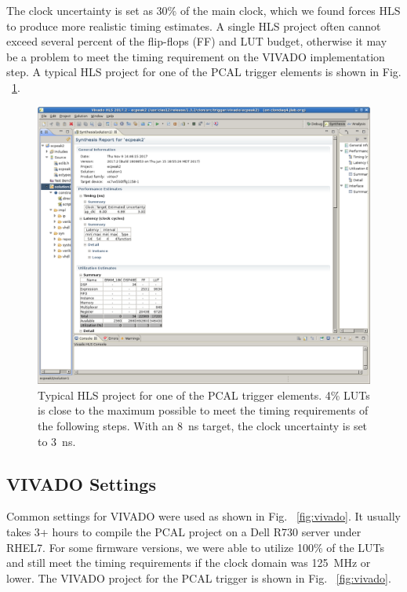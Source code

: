The clock uncertainty is set as 30\% of the main clock, which we found forces HLS to produce more realistic timing estimates. A single HLS project often cannot exceed several percent of the flip-flops (FF) and LUT budget, otherwise it may be a problem to meet the timing requirement on the VIVADO implementation step. A typical HLS project for one of the PCAL trigger elements is shown in Fig. ~\ref{fig:hls}.

\begin{figure}[hbt]
	\centering
	\includegraphics[width=1.0\columnwidth,keepaspectratio]{img/hls.png}
	\caption{Typical HLS project for one of the PCAL trigger elements. 4\% LUTs is close to the maximum possible to meet the timing requirements of the following steps. With an 8~ns target, the clock uncertainty  is set to 3~ns.}
	\label{fig:hls}
\end{figure}

\subsection{VIVADO Settings}

Common settings for VIVADO were used as shown in Fig. ~\ref{fig:vivado}. It usually takes 3+ hours to compile the PCAL project on a Dell R730 server under RHEL7. For some firmware versions, we were able to utilize 100\% of the LUTs and still meet the timing requirements if the clock domain was 125~MHz or lower. The VIVADO project for the PCAL trigger is shown in Fig. ~\ref{fig:vivado}.


